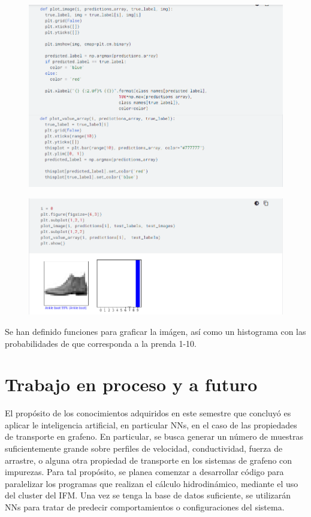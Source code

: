 \documentclass{article}
\begin{document}
\begin{figure}[th!]
   \includegraphics[width=\textwidth]{imag1.png}
\end{figure}
\begin{figure}[th!]
   \includegraphics[width=\textwidth]{imag2.png}
\end{figure}

Se han definido funciones para graficar la imágen, así como un histograma con las probabilidades de que corresponda a la prenda 1-10.

\section{Trabajo en proceso y a futuro}
El propósito de los conocimientos adquiridos en este semestre que concluyó es aplicar le inteligencia artificial, en particular NNs, en el caso de las propiedades de transporte en grafeno. En particular, se busca generar un número de muestras suficientemente grande sobre perfiles de velocidad, conductividad, fuerza de arrastre, o alguna otra propiedad de transporte en los sistemas de grafeno con impurezas. Para tal propósito, se planea comenzar a desarrollar código para paralelizar los programas que realizan el cálculo hidrodinámico, mediante el uso del cluster del IFM. Una vez se tenga la base de datos suficiente, se utilizarán NNs para tratar de predecir comportamientos o configuraciones del sistema.\\
\end{document}
